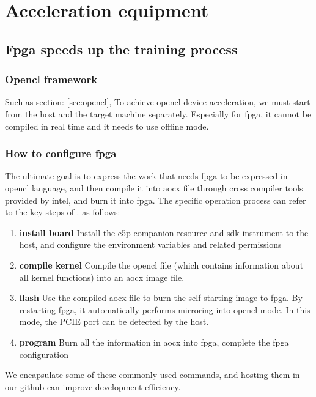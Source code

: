 \section{Acceleration equipment}
\subsection{Fpga speeds up the training process}
\subsubsection{Opencl framework}\label{sec:opencl-step}
Such as section: \ref{sec:opencl}, To achieve opencl device acceleration, we must start from the host and the target machine separately. Especially for fpga, it cannot be compiled in real time and it needs to use offline mode.
\subsubsection{How to configure fpga}
The ultimate goal is to express the work that needs fpga to be expressed in opencl language, and then compile it into aocx file through cross compiler tools provided by intel, and burn it into fpga. The specific operation process can refer to the key steps of \cite{intel-opencl}. as follows:
\begin{enumerate}
  \item{\textbf{install board}} Install the c5p companion resource and sdk instrument to the host, and configure the environment variables and related permissions
  \item{\textbf{compile kernel}} Compile the opencl file (which contains information about all kernel functions) into an aocx image file.
  \item{\textbf{flash}} Use the compiled aocx file to burn the self-starting image to fpga. By restarting fpga, it automatically performs mirroring into opencl mode. In this mode, the PCIE port can be detected by the host.
  \item{\textbf{program}} Burn all the information in aocx into fpga, complete the fpga configuration
\end{enumerate}

We encapsulate some of these commonly used commands, and hosting them in our github\cite{rcClub} can improve development efficiency.


